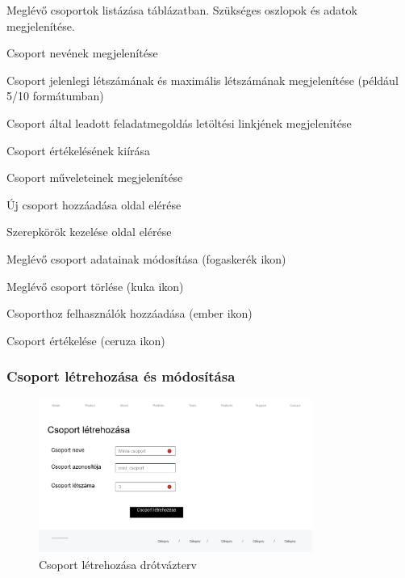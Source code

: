 \begin{compactitem}
	\item Meglévő csoportok listázása táblázatban. Szükséges oszlopok és adatok megjelenítése.
        \begin{compactitem}
            \item Csoport nevének megjelenítése
            \item Csoport jelenlegi létszámának és maximális létszámának megjelenítése (például 5/10 formátumban)
            \item Csoport által leadott feladatmegoldás letöltési linkjének megjelenítése
            \item Csoport értékelésének kiírása
            \item Csoport műveleteinek megjelenítése
        \end{compactitem}
        \item Új csoport hozzáadása oldal elérése
        \item Szerepkörök kezelése oldal elérése
        \item Meglévő csoport adatainak módosítása (fogaskerék ikon)
        \item Meglévő csoport törlése (kuka ikon)
        \item Csoporthoz felhasználók hozzáadása (ember ikon)
        \item Csoport értékelése (ceruza ikon)
 \end{compactitem}

\subsubsection{Csoport létrehozása és módosítása}

\begin{figure}[H]
	\centering
	\includegraphics[width=0.8\textwidth]{images/csoport_letrehozasa_wire.png}
	\caption{Csoport létrehozása drótvázterv}
\end{figure}

